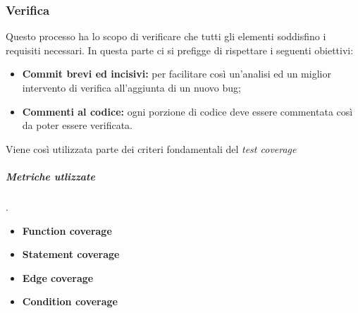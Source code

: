 \subsubsection{Verifica}
Questo processo ha lo scopo di verificare che tutti gli elementi soddisfino i requisiti necessari. In questa parte ci si prefigge di rispettare i seguenti obiettivi:
\begin{itemize}
	\item{\textbf{Commit brevi ed incisivi:} per facilitare così un'analisi ed un miglior intervento di verifica all'aggiunta di un nuovo bug;}
	\item{\textbf{Commenti al codice:} ogni porzione di codice deve essere commentata così da poter essere verificata.}
\end{itemize}
Viene così utilizzata parte dei criteri fondamentali del \textit{test coverage}
\subparagraph{Metriche utlizzate}.
\begin{itemize}
	\item{\textbf{Function coverage}}
	\item{\textbf{Statement coverage}}
	\item{\textbf{Edge coverage}}
	\item{\textbf{Condition coverage}}
\end{itemize}
\begin{table}[!htpb]
\end{table}
